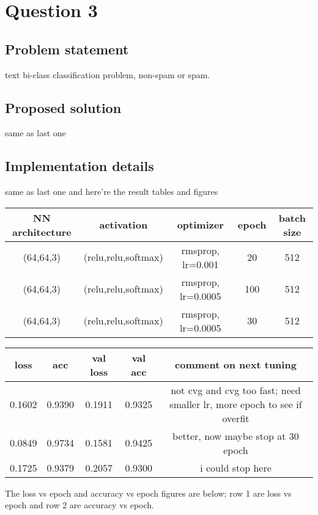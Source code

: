 \documentclass{article}
\begin{document}
\section*{Question 3}

\subsection*{Problem statement}
text bi-class classification problem, non-spam or spam.
\subsection*{Proposed solution}
same as last one
\subsection*{Implementation details}
same as last one and here're the result tables and figures


\begin{center}
    \begin{tabular}{ccccc}\hline
        NN architecture & activation & optimizer & epoch & batch size \\ \hline
        (64,64,3) & (relu,relu,softmax) & rmsprop, lr=0.001 & 20 & 512\\
        (64,64,3) & (relu,relu,softmax) & rmsprop, lr=0.0005 & 100 & 512\\
        (64,64,3) & (relu,relu,softmax) & rmsprop, lr=0.0005 & 30 & 512\\
        \hline
    \end{tabular}
\end{center}
\begin{center}
    \begin{tabular}{ccccc}\hline
        loss & acc & val loss & val acc & comment on next tuning\\ \hline
        0.1602 & 0.9390 & 0.1911 & 0.9325 & not cvg and cvg too fast; need smaller lr, more epoch to see if overfit\\
        0.0849 & 0.9734 & 0.1581 & 0.9425 & better, now maybe stop at 30 epoch\\
        0.1725 & 0.9379 & 0.2057 & 0.9300 & i could stop here \\
        \hline
    \end{tabular}
\end{center}

The loss vs epoch and accuracy vs epoch figures are below; row 1 are loss vs epoch and row 2 are accuracy vs epoch.
\end{document}
